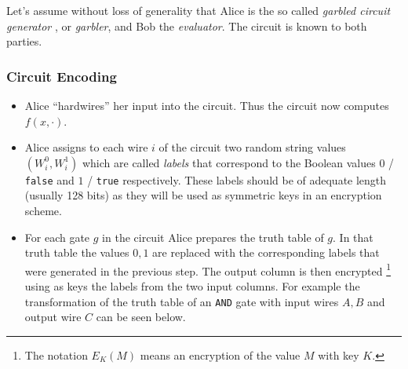 Let's assume without loss of generality that Alice is the so called \textit{garbled circuit generator
}, or \textit{garbler}, and Bob the \textit{evaluator}. The circuit is known to both parties.

\subsubsection{Circuit Encoding}

\begin{itemize}
  \item Alice ``hardwires'' her input into the circuit. Thus the circuit now computes $f(x, \cdot)$.
  \item Alice assigns to each wire $i$ of the circuit two random string values $(W_i^0, W_i^1)$ which are called \textit{labels} that correspond to the Boolean values $0$ / \texttt{false} and $1$ / \texttt{true} respectively. These labels should be of adequate length (usually 128 bits) as they will be used as symmetric keys in an encryption scheme.
  \item For each gate $g$ in the circuit Alice prepares the truth table of $g$. In that truth table the values $0,1$ are replaced with the corresponding labels that were generated in the previous step. The output column is then encrypted \footnote{The notation $E_{K}(M)$ means an encryption of the value $M$ with key $K$.} using as keys the labels from the two input columns.
  For example the transformation of the truth table of an \texttt{AND} gate with input wires $A,B$ and output wire $C$ can be seen below.


\end{itemize}
